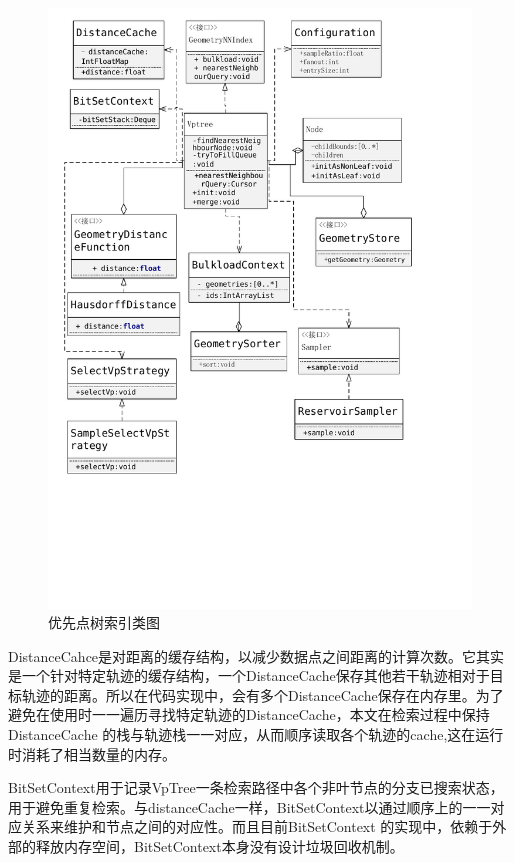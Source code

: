\begin{figure}[H]
  \centering
  \includegraphics[width=6in]{new_FIGs/chapter4/vp-tree-general-structure.pdf}
  \caption{优先点树索引类图}\label{vp-tree-general-structure}
\end{figure}

DistanceCahce是对距离的缓存结构，以减少数据点之间距离的计算次数。它其实是一个针对特定轨迹的缓存结构，一个DistanceCache保存其他若干轨迹相对于目标轨迹的距离。所以在代码实现中，会有多个DistanceCache保存在内存里。为了避免在使用时一一遍历寻找特定轨迹的DistanceCache，本文在检索过程中保持DistanceCache 的栈与轨迹栈一一对应，从而顺序读取各个轨迹的cache,这在运行时消耗了相当数量的内存。

BitSetContext用于记录VpTree一条检索路径中各个非叶节点的分支已搜索状态，用于避免重复检索。与distanceCache一样，BitSetContext以通过顺序上的一一对应关系来维护和节点之间的对应性。而且目前BitSetContext 的实现中，依赖于外部的释放内存空间，BitSetContext本身没有设计垃圾回收机制。


